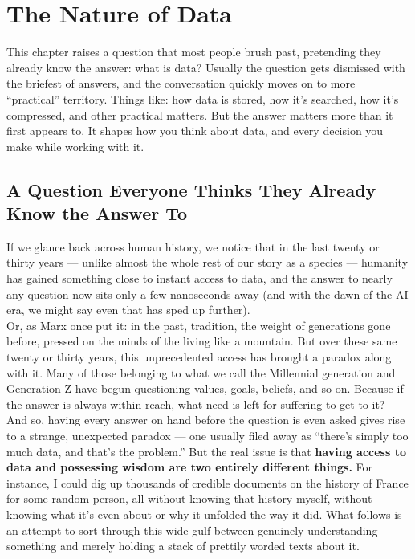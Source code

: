 \chapter{The Nature of Data}
\label{ch:nature-of-data}

This chapter raises a question that most people brush past, pretending they already know the answer: what is data?
Usually the question gets dismissed with the briefest of answers, and the conversation quickly moves on to more ``practical'' territory. Things like:
how data is stored, how it's searched, how it's compressed, and other practical matters\autocite{knuth1997,shannon1948,pierce1980}. But the answer matters more than it first appears to. It shapes how you think about data, and every decision you make while working with it.
\newpage
\section{A Question Everyone Thinks They Already Know the Answer To}
\label{sec:question-everyone-thinks-they-know}

If we glance back across human history, we notice that in the last twenty or thirty years --- unlike almost the whole rest of our story as a species --- humanity has gained something close to instant access to data, and the answer to nearly any question now sits only a few nanoseconds away (and with the dawn of the AI era, we might say even that has sped up further).\\
Or, as Marx once put it: in the past, tradition, the weight of generations gone before, pressed on the minds of the living like a mountain\autocite{marx1852}. But over these same twenty or thirty years, this unprecedented access has brought a paradox along with it. Many of those belonging to what we call the Millennial generation and Generation Z have begun questioning values, goals, beliefs, and so on. Because if the answer is always within reach, what need is left for suffering to get to it?\\
And so, having every answer on hand before the question is even asked gives rise to a strange, unexpected paradox --- one usually filed away as ``there's simply too much data, and that's the problem.'' But the real issue is that \textbf{having access to data and possessing wisdom are two entirely different things.} For instance, I could dig up thousands of credible documents on the history of France for some random person, all without knowing that history myself, without knowing what it's even about or why it unfolded the way it did. What follows is an attempt to sort through this wide gulf between genuinely understanding something and merely holding a stack of prettily worded texts about it.
\newpage
